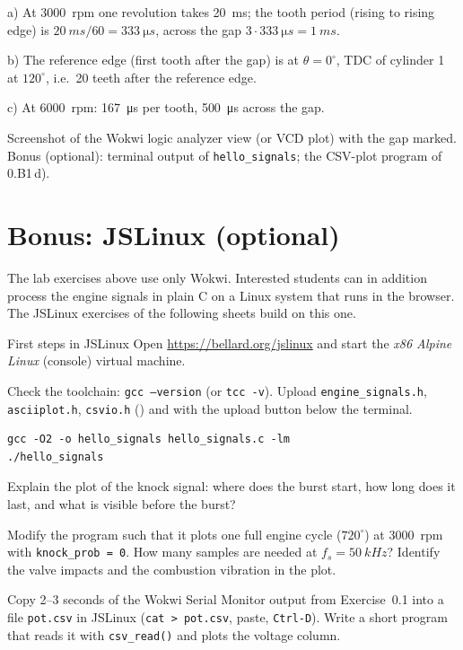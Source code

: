 \begin{solution}
a) At \SI{3000}{rpm} one revolution takes \SI{20}{ms}; the tooth period
(rising to rising edge) is $\SI{20}{ms}/60=\SI{333}{\micro s}$, across the gap
$3\cdot\SI{333}{\micro s}=\SI{1}{ms}$.

b) The reference edge (first tooth after the gap) is at $\theta=0^\circ$, TDC of
cylinder 1 at $120^\circ$, i.e.\ 20 teeth after the reference edge.

c) At \SI{6000}{rpm}: \SI{167}{\micro s} per tooth, \SI{500}{\micro s} across
the gap.
\end{solution}

\begin{deliverables}
Screenshot of the Wokwi logic analyzer view (or VCD plot) with the gap marked.
Bonus (optional): terminal output of \texttt{hello\_signals}; the CSV-plot
program of 0.B1\,d).
\end{deliverables}

\section*{Bonus: JSLinux (optional)}
\begingroup
\setcounter{exercise}{0}
The lab exercises above use only Wokwi. Interested students can in addition
process the engine signals in plain C on a Linux system that runs in the
browser. The JSLinux exercises of the following sheets build on this one.

\begin{exercise}{First steps in JSLinux}{\JSLinux}
Open \url{https://bellard.org/jslinux} and start the \emph{x86 Alpine Linux}
(console) virtual machine.
\begin{tasks}
  \item Check the toolchain: \texttt{gcc --version} (or \texttt{tcc -v}). Upload
    \texttt{engine\_signals.h}, \texttt{asciiplot.h}, \texttt{csvio.h}
    () and  with
    the upload button below the terminal.
\begin{lstlisting}[style=shell]
gcc -O2 -o hello_signals hello_signals.c -lm
./hello_signals
\end{lstlisting}
  \item Explain the plot of the knock signal: where does the burst start, how
    long does it last, and what is visible before the burst?
  \item Modify the program such that it plots one full engine cycle
    ($720^\circ$) at \SI{3000}{rpm} with \texttt{knock\_prob = 0}. How many
    samples are needed at $f_s=\SI{50}{kHz}$? Identify the valve impacts and
    the combustion vibration in the plot.
  \item Copy 2--3 seconds of the Wokwi Serial Monitor output from
    Exercise~0.1 into a file \texttt{pot.csv} in JSLinux
    (\texttt{cat > pot.csv}, paste, \texttt{Ctrl-D}). Write a short program
    that reads it with \texttt{csv\_read()} and plots the voltage column.
\end{tasks}
\end{exercise}

